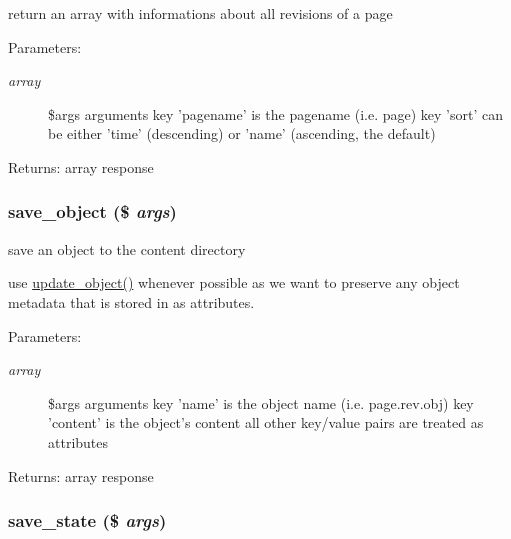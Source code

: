 return an array with informations about all revisions of a page

\begin{Desc}
\item[Parameters:]
\begin{description}
\item[{\em array}]\$args arguments key 'pagename' is the pagename (i.e. page) key 'sort' can be either 'time' (descending) or 'name' (ascending, the default) \end{description}
\end{Desc}
\begin{Desc}
\item[Returns:]array response \end{Desc}
\hypertarget{module__glue_8inc_8php_b294f21c7f6fed0932b65167f180c78c}{
\subsubsection[{save\_\-object}]{\setlength{\rightskip}{0pt plus 5cm}save\_\-object (\$ {\em args})}}
\label{module__glue_8inc_8php_b294f21c7f6fed0932b65167f180c78c}


save an object to the content directory

use \hyperlink{module__glue_8inc_8php_4aed316adcde13b40c9fc1b35e6537a4}{update\_\-object()} whenever possible as we want to preserve any object metadata that is stored in as attributes. \begin{Desc}
\item[Parameters:]
\begin{description}
\item[{\em array}]\$args arguments key 'name' is the object name (i.e. page.rev.obj) key 'content' is the object's content all other key/value pairs are treated as attributes \end{description}
\end{Desc}
\begin{Desc}
\item[Returns:]array response \end{Desc}
\hypertarget{module__glue_8inc_8php_60d03d7a0d8783e926835f0aa6cff698}{
\subsubsection[{save\_\-state}]{\setlength{\rightskip}{0pt plus 5cm}save\_\-state (\$ {\em args})}}
\label{module__glue_8inc_8php_60d03d7a0d8783e926835f0aa6cff698}


